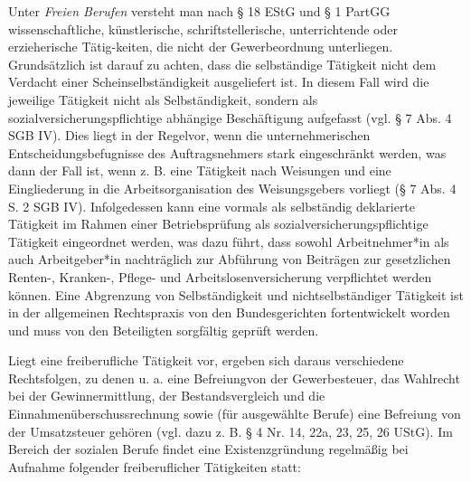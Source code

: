 \documentclass[
  letterpaper,
]{book}
\begin{document}
Unter \emph{Freien Berufen }versteht man nach § 18 EStG und § 1 PartGG
wissenschaftliche, künstlerische, schriftstellerische, unterrichtende
oder erzieherische Tätig-keiten, die nicht der Gewerbeordnung
unterliegen. Grundsätzlich ist darauf zu achten, dass die selbständige
Tätigkeit nicht dem Verdacht einer Scheinselbständigkeit ausgeliefert
ist. In diesem Fall wird die jeweilige Tätigkeit nicht als
Selbständigkeit, sondern als sozialversicherungspflichtige abhängige
Beschäftigung aufgefasst (vgl. § 7 Abs. 4 SGB IV). Dies liegt in der
Regelvor, wenn die unternehmerischen Entscheidungsbefugnisse des
Auftragsnehmers stark eingeschränkt werden, was dann der Fall ist, wenn
z. B. eine Tätigkeit nach Weisungen und eine Eingliederung in die
Arbeitsorganisation des Weisungsgebers vorliegt (§ 7 Abs. 4 S. 2 SGB
IV). Infolgedessen kann eine vormals als selbständig deklarierte
Tätigkeit im Rahmen einer Betriebsprüfung als
sozialversicherungspflichtige Tätigkeit eingeordnet werden, was dazu
führt, dass sowohl Arbeitnehmer*in als auch Arbeitgeber*in nachträglich
zur Abführung von Beiträgen zur gesetzlichen Renten-, Kranken-, Pflege-
und Arbeitslosenversicherung verpflichtet werden können. Eine Abgrenzung
von Selbständigkeit und nichtselbständiger Tätigkeit ist in der
allgemeinen Rechtspraxis von den Bundesgerichten fortentwickelt worden
und muss von den Beteiligten sorgfältig geprüft werden.

Liegt eine freiberufliche Tätigkeit vor, ergeben sich daraus
verschiedene Rechtsfolgen, zu denen u. a. eine Befreiungvon der
Gewerbesteuer, das Wahlrecht bei der Gewinnermittlung, der
Bestandsvergleich und die Einnahmenüberschussrechnung sowie (für
ausgewählte Berufe) eine Befreiung von der Umsatzsteuer gehören (vgl.
dazu z. B. § 4 Nr. 14, 22a, 23, 25, 26 UStG). Im Bereich der sozialen
Berufe findet eine Existenzgründung regelmäßig bei Aufnahme folgender
freiberuflicher Tätigkeiten statt:
\end{document}
